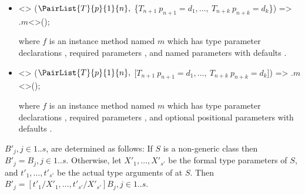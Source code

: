 \documentclass[makeidx]{article}
\begin{document}
{\LMHash{}%
\begin{itemize}
\item
\begin{normativeDartCode}
<>
($\PairList{T}{p}{1}{n},\ $\{$T_{n+1}\ p_{n+1} = d_1, \ldots,\ T_{n+k}\ p_{n+k} = d_k$\}) =>
\quad\SUPER$.m$<>();
\end{normativeDartCode}
where $f$ is an instance method named $m$
which has type parameter declarations
\TypeParametersStd,
required parameters ,
and named parameters  with defaults .
\item
\begin{normativeDartCode}
<>
($\PairList{T}{p}{1}{n},\ $[$T_{n+1}\ p_{n+1} = d_1, \ldots,\ T_{n+k}\ p_{n+k} = d_k$]) =>
\quad\SUPER.$m$<>();
\end{normativeDartCode}
where $f$ is an instance method named $m$
which has type parameter declarations
\TypeParametersStd,
required parameters ,
and optional positional parameters
 with defaults .
\end{itemize}


\LMHash{}%
$B'_j, j \in 1 .. s$, are determined as follows:
If $S$ is a non-generic class then $B'_j = B_j, j \in 1 .. s$.
Otherwise, let $X'_1, \ldots, X'_{s'}$ be the formal type parameters of $S$,
and $t'_1, \ldots, t'_{s'}$ be the actual type arguments of \THIS{} at $S$.
Then $B'_j = [t'_1/X'_1, \ldots, t'_{s'}/X'_{s'}]B_j, j \in 1 .. s$.


}
\end{document}

